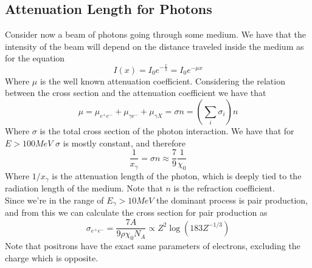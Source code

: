 \documentclass[../qm.tex]{subfiles}
\begin{document}
\subsection{Attenuation Length for Photons}
Consider now a beam of photons going through some medium. We have that the intensity of the beam will depend on the distance traveled inside the medium as for the equation
\begin{equation}
	I(x)=I_0e^{-\frac{x}{\lambda}}=I_0e^{-\mu x}
	\label{eq:gammaintmed}
\end{equation}
Where $\mu$ is the well known attenuation coefficient. Considering the relation between the cross section and the attenuation coefficient we have that
\begin{equation}
	\mu=\mu_{e^+e^-}+\mu_{\gamma e^-}+\mu_{\gamma X}=\sigma n=\left( \sum_i\sigma_i \right)n
	\label{eq:attlengthphoton}
\end{equation}
Where $\sigma$ is the total cross section of the photon interaction. We have that for $E>100\unit{MeV}$ $\sigma$ is mostly constant, and therefore
\begin{equation}
	\frac{1}{x_\gamma}=\sigma n\approx\frac{7}{9}\frac{1}{\chi_0}
	\label{eq:gammaattenuation}
\end{equation}
Where $1/x_\gamma$ is the attenuation length of the photon, which is deeply tied to the radiation length of the medium. Note that $n$ is the refraction coefficient.\\
Since we're in the range of $E_\gamma>10\unit{MeV}$ the dominant process is pair production, and from this we can calculate the cross section for pair production as
\begin{equation}
	\sigma_{e^+e^-}=\frac{7A}{9\rho\chi_0N_A}\propto Z^2\log(183Z^{-1/3})
	\label{eq:pairprodcs}
\end{equation}
Note that positrons have the exact same parameters of electrons, excluding the charge which is opposite.
\end{document}
